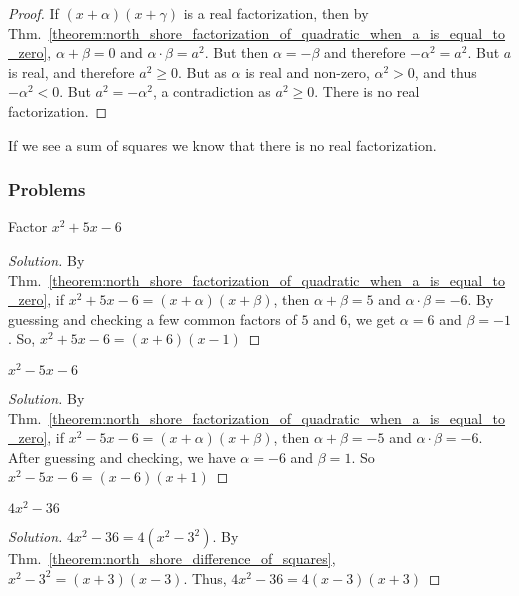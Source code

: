 \documentclass[crop=false,class=book,oneside]{standalone}
\begin{document}
            \begin{proof}
            If $(x+\alpha)(x+\gamma)$ is a real factorization, then by Thm.~\ref{theorem:north_shore_factorization_of_quadratic_when_a_is_equal_to_zero}, $\alpha+\beta=0$ and $\alpha\cdot\beta=a^{2}$. But then $\alpha=-\beta$ and therefore $-\alpha^{2}=a^{2}$. But $a$ is real, and therefore $a^{2}\geq 0$. But as $\alpha$ is real and non-zero, $\alpha^{2}>0$, and thus $-\alpha^{2}<0$. But $a^{2}=-\alpha^{2}$, a contradiction as $a^{2}\geq 0$. There is no real factorization.
            \end{proof}
            \begin{remark}
            If we see a sum of squares we know that there is no real factorization.
            \end{remark}
            \subsubsection{Problems}
            \begin{problem}
            Factor $x^{2}+5x-6$
            \end{problem}
            \begin{proof}[Solution]
            By Thm.~\ref{theorem:north_shore_factorization_of_quadratic_when_a_is_equal_to_zero}, if $x^{2}+5x-6=(x+\alpha)(x+\beta)$, then $\alpha+\beta=5$ and $\alpha\cdot\beta=-6$. By guessing and checking a few common factors of $5$ and $6$, we get $\alpha=6$ and $\beta=-1$. So, $x^{2}+5x-6=(x+6)(x-1)$
            \end{proof}
            \begin{problem}
            $x^{2}-5x-6$
            \end{problem}
            \begin{proof}[Solution]
            By Thm.~\ref{theorem:north_shore_factorization_of_quadratic_when_a_is_equal_to_zero}, if $x^{2}-5x-6=(x+\alpha)(x+\beta)$, then $\alpha+\beta=-5$ and $\alpha\cdot\beta=-6$. After guessing and checking, we have $\alpha=-6$ and $\beta=1$. So $x^{2}-5x-6=(x-6)(x+1)$
            \end{proof}
            \begin{problem}
            $4x^{2}-36$
            \end{problem}
            \begin{proof}[Solution]
            $4x^{2}-36=4(x^{2}-3^{2})$. By Thm.~\ref{theorem:north_shore_difference_of_squares}, $x^{2}-3^{2}=(x+3)(x-3)$. Thus, $4x^{2}-36=4(x-3)(x+3)$
            \end{proof}
\end{document}
